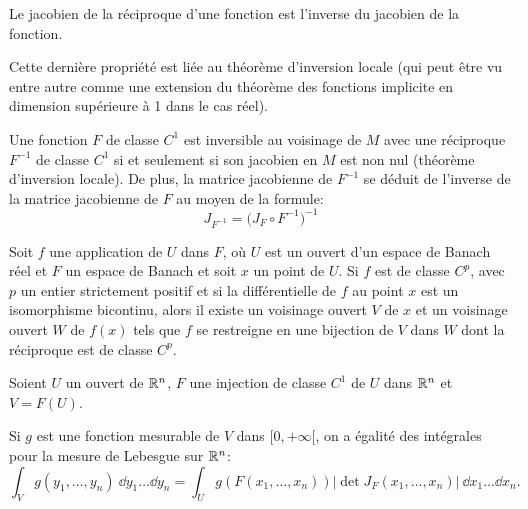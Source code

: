 \medskip
Le jacobien de la réciproque d'une fonction est l'inverse du jacobien de la fonction.

\medskip
{}
Cette dernière propriété est liée au théorème d'inversion locale (qui peut être vu entre autre
comme une extension du théorème des fonctions implicite en dimension supérieure à 1 dans le cas réel).

\medskip
Une fonction $F$ de classe $C^1$ est inversible au voisinage de $M$ avec une réciproque $F^{-1}$ 
de classe $C^1$ si et seulement si son jacobien en $M$ est non nul (théorème d'inversion locale). 
De plus, la matrice jacobienne de $F^{-1}$ se déduit de l'inverse de la matrice jacobienne de $F$ 
au moyen de la formule:
\begin{equation}J_{F^{-1}} = \bigl( J_F \circ F^{-1} \bigr)^{-1}\end{equation}


\begin{theoreme}
Soit $f$ une application de $U$ dans $F$, où $U$ est un ouvert d'un espace de Banach réel et 
$F$ un espace de Banach et soit $x$ un point de $U$.
Si $f$ est de classe $C^p$, avec $p$ un entier strictement positif et si la différentielle de $f$ au point 
$x$ est un isomorphisme bicontinu, alors il existe un voisinage ouvert $V$ de $x$ et un voisinage ouvert 
$W$ de $f(x)$ tels que $f$ se restreigne en une bijection de $V$ dans $W$ dont la réciproque est de 
classe $C^p$.
\end{theoreme}

\medskip
{}

\medskip
\begin{theoreme}

Soient $U$ un ouvert de $\mathbb R^n$, $F$ une injection de classe $C^1$ de $U$ dans $\mathbb R^n$ et $V=F(U)$.

Si $g$ est une fonction mesurable de $V$ dans $[0,+\infty[$, on a égalité des intégrales pour la mesure 
de Lebesgue sur $\mathbb R^n$:
\begin{equation}   \int_V g(y_1,\ldots,y_n)~\dd y_1\ldots\dd y_n = \int_U g\left(F\left(x_1,\ldots,x_n\right)\right) 
\left|\det J_F(x_1,\ldots,x_n)\right|~\dd x_1\ldots\dd x_n.
\end{equation}
\end{theoreme}

